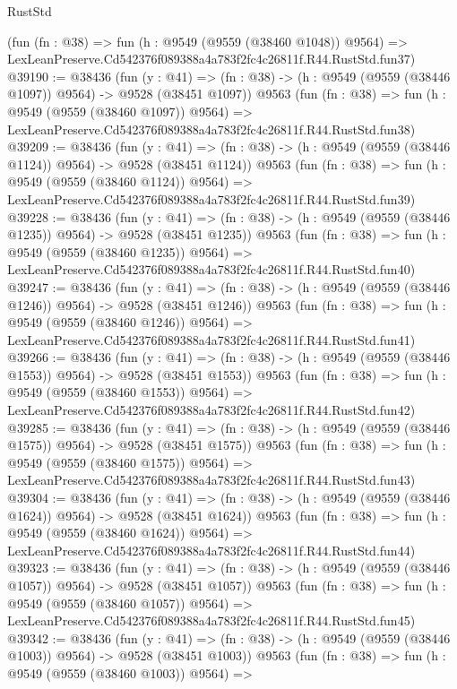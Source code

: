 \begin{lexlean}{RustStd}
\begin{coremodule}
    (fun (fn : @38) =>
    fun (h : @9549 (@9559 (@38460 @1048)) @9564) =>
    LexLeanPreserve.Cd542376f089388a4a783f2fc4c26811f.R44.RustStd.fun37)
@39190 := @38436
    (fun (y : @41) =>
    (fn : @38) -> (h : @9549 (@9559 (@38446 @1097)) @9564) -> @9528 (@38451 @1097))
    @9563
    (fun (fn : @38) =>
    fun (h : @9549 (@9559 (@38460 @1097)) @9564) =>
    LexLeanPreserve.Cd542376f089388a4a783f2fc4c26811f.R44.RustStd.fun38)
@39209 := @38436
    (fun (y : @41) =>
    (fn : @38) -> (h : @9549 (@9559 (@38446 @1124)) @9564) -> @9528 (@38451 @1124))
    @9563
    (fun (fn : @38) =>
    fun (h : @9549 (@9559 (@38460 @1124)) @9564) =>
    LexLeanPreserve.Cd542376f089388a4a783f2fc4c26811f.R44.RustStd.fun39)
@39228 := @38436
    (fun (y : @41) =>
    (fn : @38) -> (h : @9549 (@9559 (@38446 @1235)) @9564) -> @9528 (@38451 @1235))
    @9563
    (fun (fn : @38) =>
    fun (h : @9549 (@9559 (@38460 @1235)) @9564) =>
    LexLeanPreserve.Cd542376f089388a4a783f2fc4c26811f.R44.RustStd.fun40)
@39247 := @38436
    (fun (y : @41) =>
    (fn : @38) -> (h : @9549 (@9559 (@38446 @1246)) @9564) -> @9528 (@38451 @1246))
    @9563
    (fun (fn : @38) =>
    fun (h : @9549 (@9559 (@38460 @1246)) @9564) =>
    LexLeanPreserve.Cd542376f089388a4a783f2fc4c26811f.R44.RustStd.fun41)
@39266 := @38436
    (fun (y : @41) =>
    (fn : @38) -> (h : @9549 (@9559 (@38446 @1553)) @9564) -> @9528 (@38451 @1553))
    @9563
    (fun (fn : @38) =>
    fun (h : @9549 (@9559 (@38460 @1553)) @9564) =>
    LexLeanPreserve.Cd542376f089388a4a783f2fc4c26811f.R44.RustStd.fun42)
@39285 := @38436
    (fun (y : @41) =>
    (fn : @38) -> (h : @9549 (@9559 (@38446 @1575)) @9564) -> @9528 (@38451 @1575))
    @9563
    (fun (fn : @38) =>
    fun (h : @9549 (@9559 (@38460 @1575)) @9564) =>
    LexLeanPreserve.Cd542376f089388a4a783f2fc4c26811f.R44.RustStd.fun43)
@39304 := @38436
    (fun (y : @41) =>
    (fn : @38) -> (h : @9549 (@9559 (@38446 @1624)) @9564) -> @9528 (@38451 @1624))
    @9563
    (fun (fn : @38) =>
    fun (h : @9549 (@9559 (@38460 @1624)) @9564) =>
    LexLeanPreserve.Cd542376f089388a4a783f2fc4c26811f.R44.RustStd.fun44)
@39323 := @38436
    (fun (y : @41) =>
    (fn : @38) -> (h : @9549 (@9559 (@38446 @1057)) @9564) -> @9528 (@38451 @1057))
    @9563
    (fun (fn : @38) =>
    fun (h : @9549 (@9559 (@38460 @1057)) @9564) =>
    LexLeanPreserve.Cd542376f089388a4a783f2fc4c26811f.R44.RustStd.fun45)
@39342 := @38436
    (fun (y : @41) =>
    (fn : @38) -> (h : @9549 (@9559 (@38446 @1003)) @9564) -> @9528 (@38451 @1003))
    @9563
    (fun (fn : @38) =>
    fun (h : @9549 (@9559 (@38460 @1003)) @9564) =>

\end{coremodule}
\end{lexlean}

